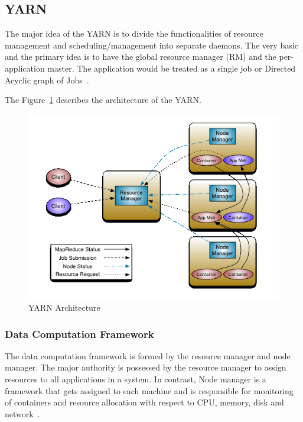 \subsection{YARN}
The major idea of the YARN is to divide the functionalities of
resource management and scheduling/management into 
separate daemons. The very basic and the primary idea 
is to have the global resource manager (RM) and the per-application master. 
The application would be treated as a single job 
or Directed Acyclic 
graph of Jobs~\cite{hid-sp18-412-YARN_Architecture}.

The Figure~\ref{s:archiyarn} describes the architecture 
of the YARN.

\begin{figure}[!ht]
\centering\includegraphics[width=\textwidth]{images/YARNArchitecture.png}
\caption{YARN 
Architecture~\cite{hid-sp18-412-YARN_Architecture}}\label{s:archiyarn}
\end{figure}

\subsubsection{Data Computation Framework}
The data computation framework is formed by the resource manager 
and node manager. The major authority is possessed  
by the resource manager to assign resources to all 
applications in a system. In contrast, 
Node manager is a framework that gets assigned 
to each machine and is responsible for monitoring of 
containers and resource allocation with 
respect to CPU, memory, disk 
and network~\cite{hid-sp18-412-YARN_Architecture}.


